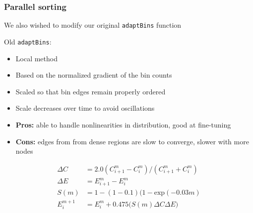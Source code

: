 \documentclass[usernames,dvipsnames]{beamer}
\begin{document}
\begin{frame}
	\frametitle{Parallel sorting}
	
	We also wished to modify our original \texttt{adaptBins} function
	
	
	\begin{block}{Old \texttt{adaptBins}:}
		\begin{itemize}
			\item Local method
			\item Based on the normalized gradient of the bin counts
			\item Scaled so that bin edges remain properly ordered
			\item Scale decreases over time to avoid oscillations
			\item \textbf{Pros:} able to handle nonlinearities in distribution, good at fine-tuning
			\item \textbf{Cons:} edges from from dense regions are slow to converge, slower with more nodes
		\end{itemize}
	\end{block}
	
	\vspace{-10pt}
	
	\begin{equation}
		\begin{split}
			\Delta C & = 2.0 ( C^{m}_{i+1} - C^{m}_i ) / ( C^{m}_{i+1} + C^{m}_i ) \\
			\Delta E & = E^m_{i+1} - E^m_i \\
			S(m) & = 1 - (1 - 0.1) (1 - \textrm{exp}(-0.03 m) \\
			E^{m+1}_i & = E^m_i + 0.475 \big( S(m) \Delta C \Delta E \big)
		\end{split}
	\end{equation}
	
\end{frame}
\end{document}
